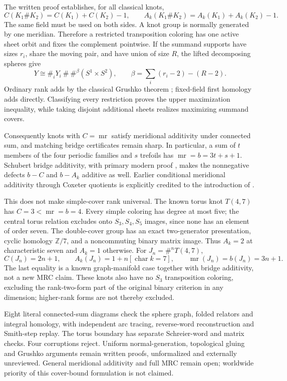 \documentclass[11pt]{article}
\newcommand{\mr}{\operatorname{mr}}
\begin{document}
The written proof establishes, for all classical knots,
\[
 C(K_1\#K_2)=C(K_1)+C(K_2)-1,\qquad
 A_k(K_1\#K_2)=A_k(K_1)+A_k(K_2)-1.
\]
The same field must be used on both sides. A knot group is
normally generated by one meridian. Therefore a restricted
transposition coloring has one active sheet orbit and fixes
the complement pointwise. If the summand supports have sizes
$r_i$, share the moving pair, and have union of size $R$,
the lifted decomposing spheres give
\[
 Y\cong\#_iY_i\ \#\ \#^{\beta}(S^1\times S^2),\qquad
 \beta=\sum_i(r_i-2)-(R-2).
\]
Ordinary rank adds by the classical Grushko theorem
\cite[Theorem 1.B.5]{stallings}; fixed-field first homology
adds directly. Classifying every restriction proves the
upper maximization inequality, while taking disjoint
additional sheets realizes maximizing summand covers.

Consequently knots with $C=\mr$ satisfy meridional additivity
under connected sum, and matching bridge certificates remain
sharp. In particular, a sum of $t$ members of the four
periodic families and $s$ trefoils has $\mr=b=3t+s+1$.
Schubert bridge additivity, with primary modern proof
\cite[Theorem 1]{schultens}, makes the nonnegative defects
$b-C$ and $b-A_k$ additive as well. Earlier conditional
meridional additivity through Coxeter quotients is explicitly
credited to the introduction of \cite{bbk}.

This does not make simple-cover rank universal. The known
torus knot $T(4,7)$ has $C=3<\mr=b=4$. Every simple coloring
has degree at most five; the central torus relation excludes
onto $S_3,S_4,S_5$ images, since none has an element of order
seven. The double-cover group has an exact two-generator
presentation, cyclic homology $\mathbb Z/7$, and a noncommuting
binary matrix image. Thus $A_k=2$ at characteristic seven
and $A_k=1$ otherwise. For $J_n=\#^nT(4,7)$,
\[
 C(J_n)=2n+1,\qquad
 A_k(J_n)=1+n[\operatorname{char}k=7],\qquad
 \mr(J_n)=b(J_n)=3n+1.
\]
The last equality is a known graph-manifold case \cite{bdjw}
together with bridge additivity, not a new MRC claim. These
knots also have no $S_3$ transposition coloring, excluding
the rank-two-form part of the original binary criterion in
any dimension; higher-rank forms are not thereby excluded.

Eight literal connected-sum diagrams check the sphere graph,
folded relators and integral homology, with independent arc
tracing, reverse-word reconstruction and Smith-step replay.
The torus boundary has separate Schreier-word and matrix
checks. Four corruptions reject. Uniform normal-generation,
topological gluing and Grushko arguments remain written proofs,
unformalized and externally unreviewed. General meridional
additivity and full MRC remain open; worldwide priority of
this cover-bound formulation is not claimed.
\end{document}
